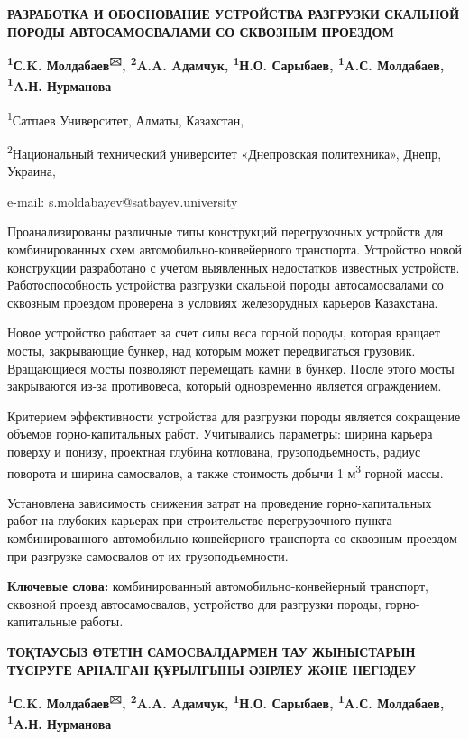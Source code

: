 {\bfseries РАЗРАБОТКА И ОБОСНОВАНИЕ УСТРОЙСТВА РАЗГРУЗКИ СКАЛЬНОЙ ПОРОДЫ
АВТОСАМОСВАЛАМИ СО СКВОЗНЫМ ПРОЕЗДОМ}

{\bfseries \textsuperscript{1}С.K. Молдабаев\textsuperscript{🖂},
\textsuperscript{2}A.A. Aдамчук, \textsuperscript{1}Н.О. Сарыбаев,
\textsuperscript{1}A.С. Молдабаев, \textsuperscript{1}A.Н. Нурманова}

\textsuperscript{1}Сатпаев Университет, Алматы, Казахстан,

\textsuperscript{2}Национальный технический университет «Днепровская
политехника», Днепр, Украина,

e-mail: s.moldabayev@satbayev.university

Проанализированы различные типы конструкций перегрузочных устройств для
комбинированных схем автомобильно-конвейерного транспорта. Устройство
новой конструкции разработано с учетом выявленных недостатков известных
устройств. Работоспособность устройства разгрузки скальной породы
автосамосвалами со сквозным проездом проверена в условиях железорудных
карьеров Казахстана.

Новое устройство работает за счет силы веса горной породы, которая
вращает мосты, закрывающие бункер, над которым может передвигаться
грузовик. Вращающиеся мосты позволяют перемещать камни в бункер. После
этого мосты закрываются из-за противовеса, который одновременно является
ограждением.

Критерием эффективности устройства для разгрузки породы является
сокращение объемов горно-капитальных работ. Учитывались параметры:
ширина карьера поверху и понизу, проектная глубина котлована,
грузоподъемность, радиус поворота и ширина самосвалов, а также стоимость
добычи 1 м\textsuperscript{3} горной массы.

Установлена зависимость снижения затрат на проведение горно-капитальных
работ на глубоких карьерах при строительстве перегрузочного пункта
комбинированного автомобильно-конвейерного транспорта со сквозным
проездом при разгрузке самосвалов от их грузоподъемности.

{\bfseries Ключевые слова:} комбинированный автомобильно-конвейерный
транспорт, сквозной проезд автосамосвалов, устройство для разгрузки
породы, горно-капитальные работы\emph{.}

{\bfseries ТОҚТАУСЫЗ ӨТЕТІН САМОСВАЛДАРМЕН ТАУ ЖЫНЫСТАРЫН ТҮСІРУГЕ АРНАЛҒАН
ҚҰРЫЛҒЫНЫ ӘЗІРЛЕУ ЖӘНЕ НЕГІЗДЕУ}

{\bfseries \textsuperscript{1}С.K. Молдабаев\textsuperscript{🖂},
\textsuperscript{2}A.A. Aдамчук, \textsuperscript{1}Н.О. Сарыбаев,
\textsuperscript{1}A.С. Молдабаев, \textsuperscript{1}A.Н. Нурманова}

